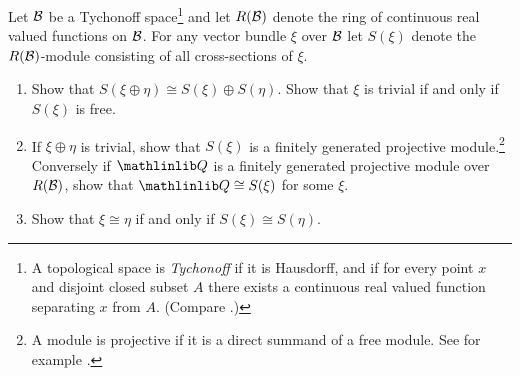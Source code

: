 \begin{problem}\label{prob-3-F}
	Let $\mathcal{B}$ be a Tychonoff space\footnote{A topological space is \textit{Tychonoff} if it is Hausdorff, and if for every point $x$
		and disjoint closed subset $A$ there exists a continuous real valued function
		separating $x$ from $A$. (Compare \cite{41}.)} and
	let $R(\mathcal{B})$ denote the ring of continuous real valued functions on $\mathcal{B}$. For
	any vector bundle $\xi$ over $\mathcal{B}$ let $S(\xi)$ denote the $R(\mathcal{B})$-module 
	consisting of all cross-sections of $\xi$.
	\begin{enumerate}[label=\alph*),leftmargin=2\parindent ]
		\item Show that $S(\xi\oplus\eta)\cong S(\xi)\oplus S(\eta)$. Show that $\xi$ is trivial if and
		only if $S(\xi)$ is free.
		\item If $\xi\oplus\eta$ is trivial, show that $S(\xi)$ is a finitely generated projective module.\footnote{A module is projective if it is a direct summand of a free module. See for
			example \cite[p.~368]{45}.} Conversely if $\Q$ is a finitely generated projective module
		over $R(\mathcal{B})$, show that $\Q\cong S(\xi)$ for some $\xi$.
		
		\item Show that $\xi\cong\eta$ if and only if $S(\xi)\cong S(\eta)$.
	\end{enumerate}
\end{problem}

